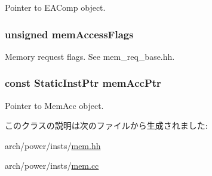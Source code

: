 Pointer to EAComp object. \hypertarget{classPowerISA_1_1MemOp_a827c936c9e2b1f1cf21a01f204a8d821}{
\subsubsection[{memAccessFlags}]{\setlength{\rightskip}{0pt plus 5cm}unsigned {\bf memAccessFlags}}}
\label{classPowerISA_1_1MemOp_a827c936c9e2b1f1cf21a01f204a8d821}


Memory request flags. See mem\_\-req\_\-base.hh. \hypertarget{classPowerISA_1_1MemOp_a5349ed0f46076d7cc6e93c3e32b5adc7}{
\subsubsection[{memAccPtr}]{\setlength{\rightskip}{0pt plus 5cm}const {\bf StaticInstPtr} {\bf memAccPtr}}}
\label{classPowerISA_1_1MemOp_a5349ed0f46076d7cc6e93c3e32b5adc7}


Pointer to MemAcc object. 

このクラスの説明は次のファイルから生成されました:\begin{DoxyCompactItemize}
\item 
arch/power/insts/\hyperlink{power_2insts_2mem_8hh}{mem.hh}\item 
arch/power/insts/\hyperlink{power_2insts_2mem_8cc}{mem.cc}\end{DoxyCompactItemize}
